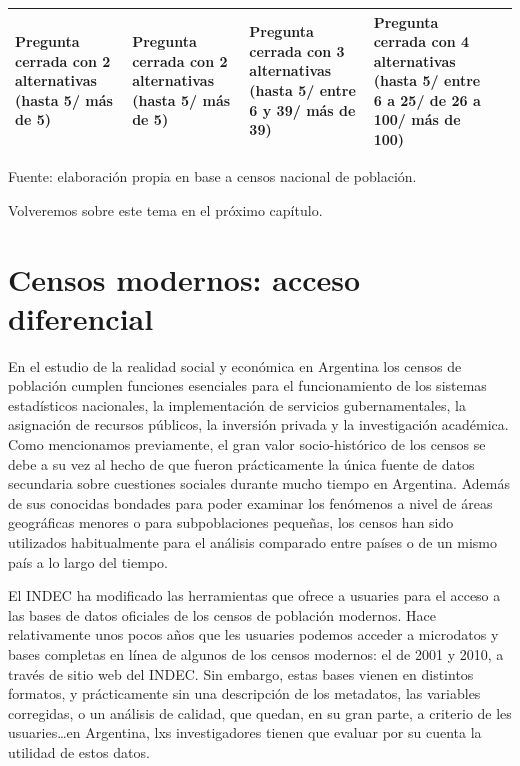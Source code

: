 \documentclass[
]{book}
\begin{document}
\begin{longtable}[]{@{}lllll@{}}
\begin{minipage}[t]{0.24\columnwidth}
Pregunta cerrada con 2 alternativas (hasta 5/ más de 5)\strut
\end{minipage} & \begin{minipage}[t]{0.24\columnwidth}\raggedright
Pregunta cerrada con 2 alternativas (hasta 5/ más de 5)\strut
\end{minipage} & \begin{minipage}[t]{0.15\columnwidth}\raggedright
Pregunta cerrada con 3 alternativas (hasta 5/ entre 6 y 39/ más de 39)\strut
\end{minipage} & \begin{minipage}[t]{0.17\columnwidth}\raggedright
Pregunta cerrada con 4 alternativas (hasta 5/ entre 6 a 25/ de 26 a 100/ más de 100)\strut
\end{minipage}\tabularnewline
\bottomrule
\end{longtable}

Fuente: elaboración propia en base a censos nacional de población.

Volveremos sobre este tema en el próximo capítulo.

\hypertarget{censos2}{%
\section{Censos modernos: acceso diferencial}\label{censos2}}

En el estudio de la realidad social y económica en Argentina los censos de población cumplen funciones esenciales para el funcionamiento de los sistemas estadísticos nacionales, la implementación de servicios gubernamentales, la asignación de recursos públicos, la inversión privada y la investigación académica. Como mencionamos previamente, el gran valor socio-histórico de los censos se debe a su vez al hecho de que fueron prácticamente la única fuente de datos secundaria sobre cuestiones sociales durante mucho tiempo en Argentina. Además de sus conocidas bondades para poder examinar los fenómenos a nivel de áreas geográficas menores o para subpoblaciones pequeñas, los censos han sido utilizados habitualmente para el análisis comparado entre países o de un mismo país a lo largo del tiempo.

El INDEC ha modificado las herramientas que ofrece a usuaries para el acceso a las bases de datos oficiales de los censos de población modernos. Hace relativamente unos pocos años que les usuaries podemos acceder a microdatos y bases completas en línea de algunos de los censos modernos: el de 2001 y 2010, a través de sitio web del INDEC. Sin embargo, estas bases vienen en distintos formatos, y prácticamente sin una descripción de los metadatos, las variables corregidas, o un análisis de calidad, que quedan, en su gran parte, a criterio de les usuaries\ldots en Argentina, lxs investigadores tienen que evaluar por su cuenta la utilidad de estos datos.
\end{document}
